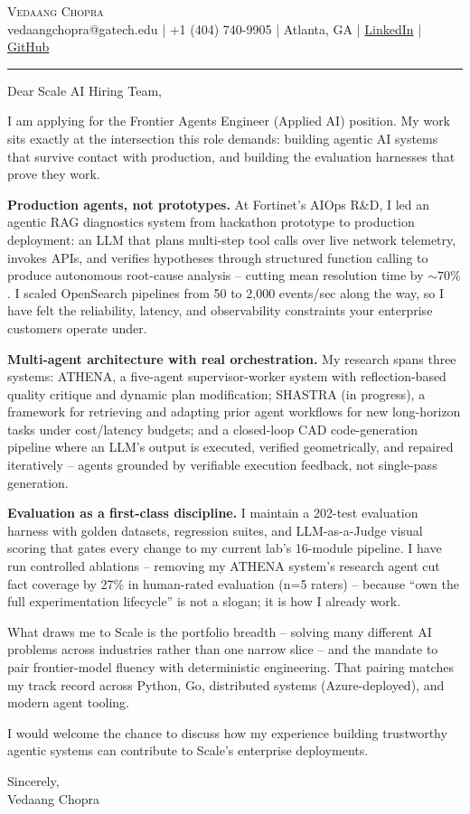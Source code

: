 \documentclass[letterpaper,11pt]{article}
\begin{document}
{\Huge \scshape Vedaang Chopra}\\[2pt]
\small vedaangchopra@gatech.edu \;|\; +1 (404) 740-9905 \;|\; Atlanta, GA \;|\;
\href{https://linkedin.com/in/vedaang-chopra}{LinkedIn} \;|\;
\href{https://github.com/Vedaang-Chopra}{GitHub}

\vspace{10pt}
\hrule
\vspace{14pt}

Dear Scale AI Hiring Team,

I am applying for the Frontier Agents Engineer (Applied AI) position. My work sits exactly at the intersection this role demands: building agentic AI systems that survive contact with production, and building the evaluation harnesses that prove they work.

\textbf{Production agents, not prototypes.} At Fortinet's AIOps R\&D, I led an agentic RAG diagnostics system from hackathon prototype to production deployment: an LLM that plans multi-step tool calls over live network telemetry, invokes APIs, and verifies hypotheses through structured function calling to produce autonomous root-cause analysis -- cutting mean resolution time by ${\sim}70\%$. I scaled OpenSearch pipelines from 50 to 2,000 events/sec along the way, so I have felt the reliability, latency, and observability constraints your enterprise customers operate under.

\textbf{Multi-agent architecture with real orchestration.} My research spans three systems: ATHENA, a five-agent supervisor-worker system with reflection-based quality critique and dynamic plan modification; SHASTRA (in progress), a framework for retrieving and adapting prior agent workflows for new long-horizon tasks under cost/latency budgets; and a closed-loop CAD code-generation pipeline where an LLM's output is executed, verified geometrically, and repaired iteratively -- agents grounded by verifiable execution feedback, not single-pass generation.

\textbf{Evaluation as a first-class discipline.} I maintain a 202-test evaluation harness with golden datasets, regression suites, and LLM-as-a-Judge visual scoring that gates every change to my current lab's 16-module pipeline. I have run controlled ablations -- removing my ATHENA system's research agent cut fact coverage by 27\% in human-rated evaluation (n=5 raters) -- because ``own the full experimentation lifecycle'' is not a slogan; it is how I already work.

What draws me to Scale is the portfolio breadth -- solving many different AI problems across industries rather than one narrow slice -- and the mandate to pair frontier-model fluency with deterministic engineering. That pairing matches my track record across Python, Go, distributed systems (Azure-deployed), and modern agent tooling.

I would welcome the chance to discuss how my experience building trustworthy agentic systems can contribute to Scale's enterprise deployments.

\vspace{8pt}
Sincerely,\\
Vedaang Chopra
\end{document}
